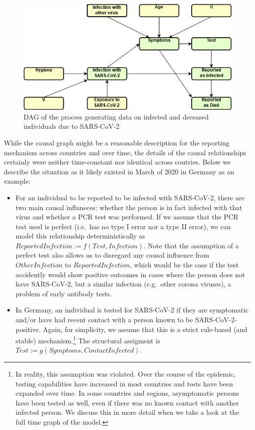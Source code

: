 \documentclass[
]{book}
\providecommand{\tightlist}{%
  \setlength{\itemsep}{0pt}\setlength{\parskip}{0pt}}
\theoremstyle{definition}
\theoremstyle{definition}
\theoremstyle{definition}
\theoremstyle{remark}
\begin{document}
\begin{figure}
\centering
\includegraphics{images/dag_app_epidem1.png}
\caption{DAG of the process generating data on infected and deceased individuals due to SARS-CoV-2}
\end{figure}

While the causal graph might be a reasonable description for the reporting mechanism across countries and over time, the details of the causal relationships certainly were neither time-constant nor identical across coutries. Below we describe the situation as it likely existed in March of 2020 in Germany as an example:

\begin{itemize}
\tightlist
\item
  For an individual to be reported to be infected with SARS-CoV-2, there are two main causal influneces: whether the person is in fact infected with that virus and whether a PCR test was performed. If we assume that the PCR test used is perfect (i.e.~has no type I error nor a type II error), we can model this relationship deterministically as \(ReportedInfection := f(Test, Infection)\). Note that the assumption of a perfect test also allows us to disregard any causal influence from \(OtherInfection\) to \(ReportedInfection\), which would be the case if the test accidently would show positive outcomes in cases where the person does not have SARS-CoV-2, but a similar infection (e.g.~other corona viruses), a problem of early antibody tests.
\item
  In Germany, an individual is tested for SARS-CoV-2 if they are symptomatic and/or have had recent contact with a person known to be SARS-CoV-2-positive. Again, for simplicity, we assume that this is a strict rule-based (and stable) mechanism.\footnote{In reality, this assumption was violated. Over the course of the epidemic, testing capabilities have increased in most countries and tests have been expanded over time. In some countries and regions, asymptomatic persons have been tested as well, even if there was no known contact with another infected person. We discuss this in more detail when we take a look at the full time graph of the model.} The structural assigment is \(Test := g(Symptoms, ContactInfected)\).
\end{itemize}
\end{document}
